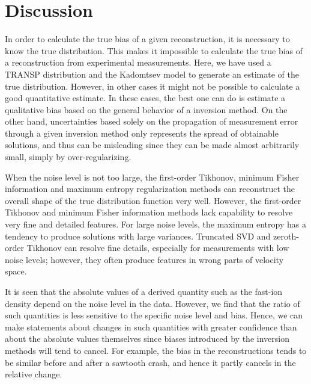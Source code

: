 \section{Discussion}
In order to calculate the true bias of a given reconstruction, it is necessary to know the true distribution. This makes it impossible to calculate the true bias of a reconstruction from experimental measurements. Here, we have used a TRANSP distribution and the Kadomtsev model to generate an estimate of the true distribution. 
However, in other cases it might not be possible to calculate a good quantitative estimate. 
In these cases, the best one can do is estimate a qualitative bias based on the general behavior of a inversion method.
On the other hand, uncertainties based solely on the propagation of measurement error through a given inversion method only represents the spread of obtainable solutions, and thus can be misleading since they can be made almost arbitrarily small, simply by over-regularizing.

When the noise level is not too large, 
the first-order Tikhonov, minimum Fisher information and maximum entropy regularization methods can reconstruct the overall shape of the true distribution function very well.
However, the first-order Tikhonov and minimum Fisher information methods lack capability to resolve very fine and detailed features.
For large noise levels, the maximum entropy has a tendency to produce solutions with large variances.
Truncated SVD and zeroth-order Tikhonov can resolve fine details, especially for measurements with low noise levels; however, they often produce features in wrong parts of velocity space.

It is seen that the absolute values of a derived quantity such as the fast-ion density depend on the noise level in the data. However, we find that the ratio of such quantities is less sensitive to the specific noise level and bias. Hence, we can make statements about changes in such quantities with greater confidence than about the absolute values themselves since biases introduced by the inversion methods will tend to cancel. For example, the bias in the reconstructions tends to be similar before and after a sawtooth crash, and hence it partly cancels in the relative change.
